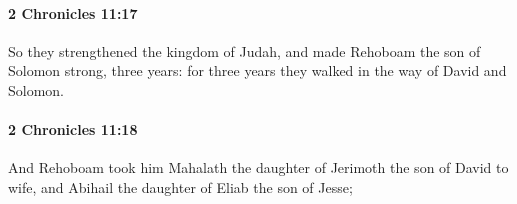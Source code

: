 		\paragraph{2 Chronicles 11:17} %
			\label{2CHRONICLES-11-17}

			So they strengthened the kingdom of Judah, and made Rehoboam the son of Solomon strong, three years: for three years they walked in the way of David and Solomon.


		\paragraph{2 Chronicles 11:18} %
			\label{2CHRONICLES-11-18}

			And Rehoboam took him Mahalath the daughter of Jerimoth the son of David to wife, and Abihail the daughter of Eliab the son of Jesse;


